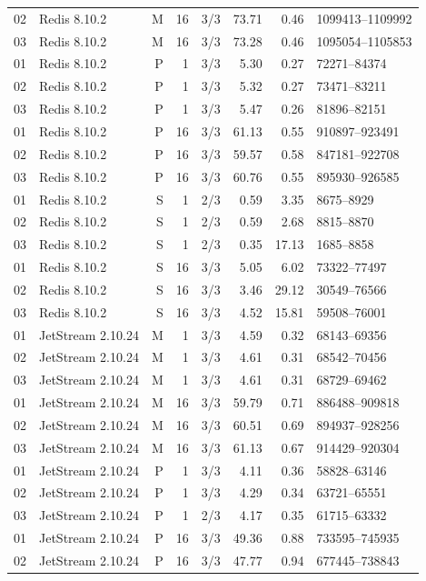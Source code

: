\begin{longtable}{llrrrrrl}
02 & Redis 8.10.2 & M & 16 & 3/3 & 73.71 & 0.46 & 1099413--1109992\\
03 & Redis 8.10.2 & M & 16 & 3/3 & 73.28 & 0.46 & 1095054--1105853\\
01 & Redis 8.10.2 & P & 1 & 3/3 & 5.30 & 0.27 & 72271--84374\\
02 & Redis 8.10.2 & P & 1 & 3/3 & 5.32 & 0.27 & 73471--83211\\
03 & Redis 8.10.2 & P & 1 & 3/3 & 5.47 & 0.26 & 81896--82151\\
01 & Redis 8.10.2 & P & 16 & 3/3 & 61.13 & 0.55 & 910897--923491\\
02 & Redis 8.10.2 & P & 16 & 3/3 & 59.57 & 0.58 & 847181--922708\\
03 & Redis 8.10.2 & P & 16 & 3/3 & 60.76 & 0.55 & 895930--926585\\
01 & Redis 8.10.2 & S & 1 & 2/3 & 0.59 & 3.35 & 8675--8929\\
02 & Redis 8.10.2 & S & 1 & 2/3 & 0.59 & 2.68 & 8815--8870\\
03 & Redis 8.10.2 & S & 1 & 2/3 & 0.35 & 17.13 & 1685--8858\\
01 & Redis 8.10.2 & S & 16 & 3/3 & 5.05 & 6.02 & 73322--77497\\
02 & Redis 8.10.2 & S & 16 & 3/3 & 3.46 & 29.12 & 30549--76566\\
03 & Redis 8.10.2 & S & 16 & 3/3 & 4.52 & 15.81 & 59508--76001\\
01 & JetStream 2.10.24 & M & 1 & 3/3 & 4.59 & 0.32 & 68143--69356\\
02 & JetStream 2.10.24 & M & 1 & 3/3 & 4.61 & 0.31 & 68542--70456\\
03 & JetStream 2.10.24 & M & 1 & 3/3 & 4.61 & 0.31 & 68729--69462\\
01 & JetStream 2.10.24 & M & 16 & 3/3 & 59.79 & 0.71 & 886488--909818\\
02 & JetStream 2.10.24 & M & 16 & 3/3 & 60.51 & 0.69 & 894937--928256\\
03 & JetStream 2.10.24 & M & 16 & 3/3 & 61.13 & 0.67 & 914429--920304\\
01 & JetStream 2.10.24 & P & 1 & 3/3 & 4.11 & 0.36 & 58828--63146\\
02 & JetStream 2.10.24 & P & 1 & 3/3 & 4.29 & 0.34 & 63721--65551\\
03 & JetStream 2.10.24 & P & 1 & 2/3 & 4.17 & 0.35 & 61715--63332\\
01 & JetStream 2.10.24 & P & 16 & 3/3 & 49.36 & 0.88 & 733595--745935\\
02 & JetStream 2.10.24 & P & 16 & 3/3 & 47.77 & 0.94 & 677445--738843\\

\end{longtable}
